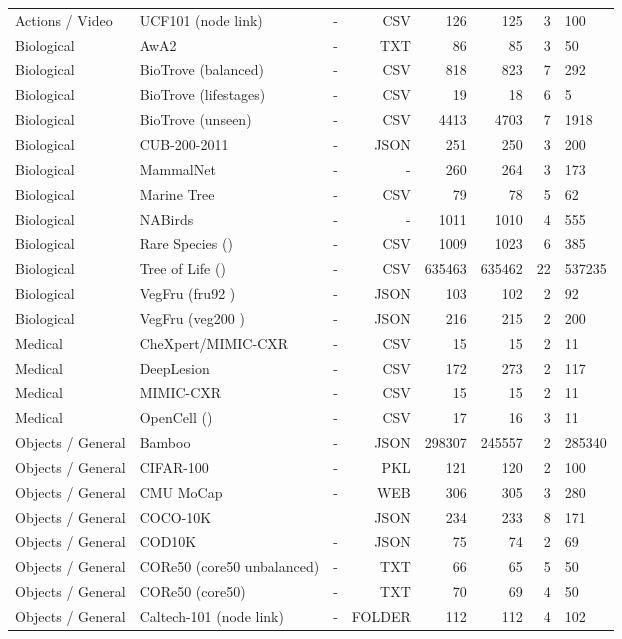 \begin{table}
\begin{tabular}{lll|rrrr}
Actions / Video & UCF101 (node link) & - & CSV & 126 & 125 & 3 & 100 \\
Biological & AwA2 & - & TXT & 86 & 85 & 3 & 50 \\
Biological & BioTrove (balanced) & - & CSV & 818 & 823 & 7 & 292 \\
Biological & BioTrove (lifestages) & - & CSV & 19 & 18 & 6 & 5 \\
Biological & BioTrove (unseen) & - & CSV & 4413 & 4703 & 7 & 1918 \\
Biological & CUB-200-2011 & - & JSON & 251 & 250 & 3 & 200 \\
Biological & MammalNet & - & - & 260 & 264 & 3 & 173 \\
Biological & Marine Tree & - & CSV & 79 & 78 & 5 & 62 \\
Biological & NABirds & - & - & 1011 & 1010 & 4 & 555 \\
Biological & Rare Species () & - & CSV & 1009 & 1023 & 6 & 385 \\
Biological & Tree of Life () & - & CSV & 635463 & 635462 & 22 & 537235 \\
Biological & VegFru (fru92 ) & - & JSON & 103 & 102 & 2 & 92 \\
Biological & VegFru (veg200 ) & - & JSON & 216 & 215 & 2 & 200 \\
Medical & CheXpert/MIMIC-CXR & - & CSV & 15 & 15 & 2 & 11 \\
Medical & DeepLesion & - & CSV & 172 & 273 & 2 & 117 \\
Medical & MIMIC-CXR & - & CSV & 15 & 15 & 2 & 11 \\
Medical & OpenCell () & - & CSV & 17 & 16 & 3 & 11 \\
Objects / General & Bamboo & - & JSON & 298307 & 245557 & 2 & 285340 \\
Objects / General & CIFAR-100 & - & PKL & 121 & 120 & 2 & 100 \\
Objects / General & CMU MoCap & - & WEB & 306 & 305 & 3 & 280 \\
Objects / General & COCO-10K & \cite{atigh2022hyperbolic} & JSON & 234 & 233 & 8 & 171 \\
Objects / General & COD10K & - & JSON & 75 & 74 & 2 & 69 \\
Objects / General & CORe50 (core50 unbalanced) & - & TXT & 66 & 65 & 5 & 50 \\
Objects / General & CORe50 (core50) & - & TXT & 70 & 69 & 4 & 50 \\
Objects / General & Caltech-101 (node link) & - & FOLDER & 112 & 112 & 4 & 102 \\

\end{tabular}
\end{table}
